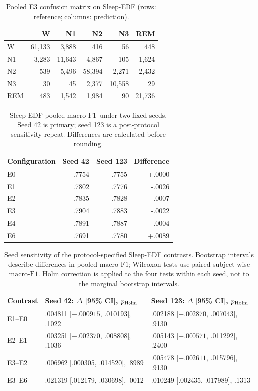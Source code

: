 \documentclass[10pt,a4paper]{article}
\newcommand{\mf}{\ensuremath{\mathrm{macro\text{-}F1}}}
\newcommand{\ci}{95\% CI}
\begin{document}
\begin{table}[H]
\centering\small
\caption{Pooled E3 confusion matrix on Sleep-EDF (rows: reference; columns: prediction).}
\label{tab:sup_edf_confusion}
\begin{tabular}{lrrrrr}
\toprule
 & W & N1 & N2 & N3 & REM \\
\midrule
W & 61{,}133 & 3{,}888 & 416 & 56 & 448 \\
N1 & 3{,}283 & 11{,}643 & 4{,}867 & 105 & 1{,}624 \\
N2 & 539 & 5{,}496 & 58{,}394 & 2{,}271 & 2{,}432 \\
N3 & 30 & 45 & 2{,}377 & 10{,}558 & 29 \\
REM & 483 & 1{,}542 & 1{,}984 & 90 & 21{,}736 \\
\bottomrule
\end{tabular}
\end{table}

\begin{table}[H]
\centering\small
\caption{Sleep-EDF pooled \mf\ under two fixed seeds. Seed 42 is primary; seed 123 is a
post-protocol sensitivity repeat. Differences are calculated before rounding.}
\label{tab:sup_edf_seeds}
\begin{tabular}{lrrr}
\toprule
Configuration & Seed 42 & Seed 123 & Difference \\
\midrule
E0 & .7754 & .7755 & +.0000 \\
E1 & .7802 & .7776 & -.0026 \\
E2 & .7835 & .7828 & -.0007 \\
E3 & .7904 & .7883 & -.0022 \\
E4 & .7891 & .7887 & -.0004 \\
E6 & .7691 & .7780 & +.0089 \\
\bottomrule
\end{tabular}
\end{table}

\begin{table}[H]
\centering\small
\caption{Seed sensitivity of the protocol-specified Sleep-EDF contrasts. Bootstrap intervals
describe differences in pooled \mf; Wilcoxon tests use paired subject-wise \mf. Holm correction
is applied to the four tests within each seed, not to the marginal bootstrap intervals.}
\label{tab:sup_edf_seed_contrasts}
\begin{tabular}{lll}
\toprule
Contrast & Seed 42: $\Delta$ [\ci], $p_{\rm Holm}$ & Seed 123: $\Delta$ [\ci], $p_{\rm Holm}$ \\
\midrule
E1--E0 & .004811 [$-.000915$, .010193], .1022 & .002188 [$-.002870$, .007043], .9130 \\
E2--E1 & .003251 [$-.002370$, .008808], .1036 & .005143 [$-.000571$, .011292], .2400 \\
E3--E2 & .006962 [.000305, .014520], .8989 & .005478 [$-.002611$, .015796], .9130 \\
E3--E6 & .021319 [.012179, .030698], .0012 & .010249 [.002435, .017989], .1313 \\
\bottomrule
\end{tabular}
\end{table}
\end{document}
